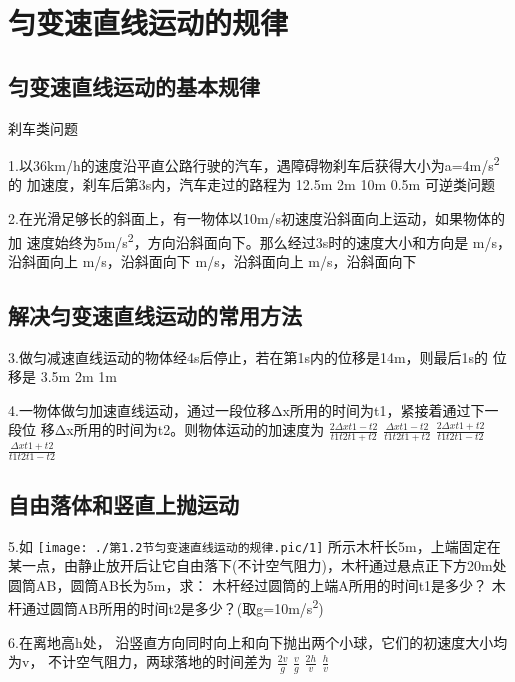 \documentclass[a4paper,fontset=windows]{ctexart}
\begin{document}
\section{匀变速直线运动的规律}

\subsection{匀变速直线运动的基本规律}

刹车类问题

1.以36\si{km/h}的速度沿平直公路行驶的汽车，遇障碍物刹车后获得大小为a=4\si{m/s^2}的
加速度，刹车后第3s内，汽车走过的路程为
\choice[A] 12.5m
\choice[B] 2m
\choice[C] 10m
\choice[D] 0.5m
可逆类问题

2.在光滑足够长的斜面上，有一物体以10\si{m/s}初速度沿斜面向上运动，如果物体的加
速度始终为5\si{m/s^2}，方向沿斜面向下。那么经过3s时的速度大小和方向是
\si{m/s}，沿斜面向上
\si{m/s}，沿斜面向下
\si{m/s}，沿斜面向上
\si{m/s}，沿斜面向下

\subsection{解决匀变速直线运动的常用方法}


3.做匀减速直线运动的物体经4s后停止，若在第1s内的位移是14m，则最后1s的
位移是
\choice[A] 3.5m
\choice[B] 2m
\choice[C] 1m

4.一物体做匀加速直线运动，通过一段位移Δx所用的时间为t1，紧接着通过下一段位
移Δx所用的时间为t2。则物体运动的加速度为
\choice[A]  $\frac{2Δxt1-t2}{t1t2t1+t2}$ 
\choice[B]  $\frac{Δxt1-t2}{t1t2t1+t2}$ 
\choice[C]  $\frac{2Δxt1+t2}{t1t2t1-t2}$ 
\choice[D]  $\frac{Δxt1+t2}{t1t2t1-t2}$ 

\subsection{自由落体和竖直上抛运动}


5.如 \texttt{[image: ./第1.2节匀变速直线运动的规律.pic/1]} 所示木杆长5m，上端固定在某一点，由静止放开后让它自由落下(不计空气阻力)，木杆通过悬点正下方20m处圆筒AB，圆筒AB长为5m，求：
\qitem 木杆经过圆筒的上端A所用的时间t1是多少？
\qitem 木杆通过圆筒AB所用的时间t2是多少？(取g=10\si{m/s^2})

6.在离地高h处，
沿竖直方向同时向上和向下抛出两个小球，它们的初速度大小均为v，
不计空气阻力，两球落地的时间差为
\choice[A]  $\frac{2v}{g}$ 
\choice[B]  $\frac{v}{g}$ 
\choice[C]  $\frac{2h}{v}$ 
\choice[D]  $\frac{h}{v}$ 
\end{document}
